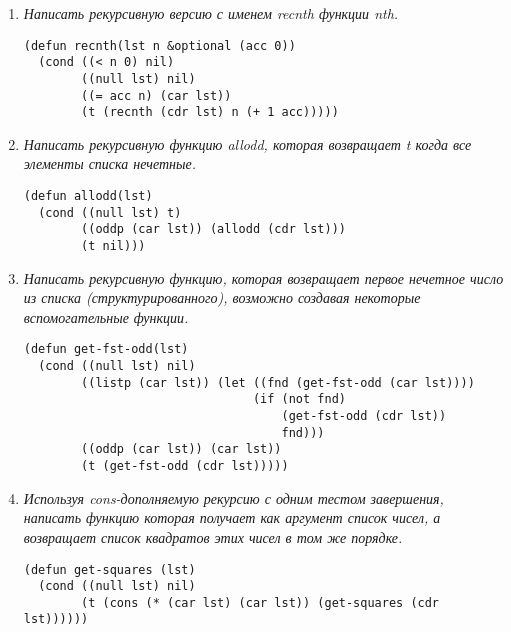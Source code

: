 \begin{enumerate}[wide=0pt]
\begin{lstlisting}
;; ================================ (b) =================================
(defun rec-add-structured (lst &optional (acc 0))
  (cond ((null lst) acc)
        ((numberp (car lst)) (rec-add-structured (cdr lst) (+ acc (car lst))))
        ((listp (car lst))
                (rec-add-structured (cdr lst)
                                    (rec-add-structured (car lst) acc)))
        (t (rec-add-structured (cdr lst) acc))))
\end{lstlisting}
\item \textit{Написать рекурсивную версию с именем recnth функции nth.}
\begin{lstlisting}
(defun recnth(lst n &optional (acc 0))
  (cond ((< n 0) nil)
        ((null lst) nil)
        ((= acc n) (car lst))
        (t (recnth (cdr lst) n (+ 1 acc)))))
\end{lstlisting}
\item \textit{Написать рекурсивную функцию allodd, которая возвращает t когда все элементы списка нечетные.}
\begin{lstlisting}
(defun allodd(lst)
  (cond ((null lst) t)
        ((oddp (car lst)) (allodd (cdr lst)))
        (t nil)))
\end{lstlisting}
\item \textit{ Написать рекурсивную функцию, которая возвращает первое нечетное число из списка (структурированного), возможно создавая некоторые вспомогательные функции.}
\begin{lstlisting}
(defun get-fst-odd(lst)
  (cond ((null lst) nil)
        ((listp (car lst)) (let ((fnd (get-fst-odd (car lst))))
                                (if (not fnd)
                                    (get-fst-odd (cdr lst))
                                    fnd)))
        ((oddp (car lst)) (car lst))
        (t (get-fst-odd (cdr lst)))))
\end{lstlisting}
\item \textit{Используя cons-дополняемую рекурсию с одним тестом завершения, написать функцию которая получает как аргумент список чисел, а возвращает список квадратов этих чисел в том же порядке.}
\begin{lstlisting}
(defun get-squares (lst)
  (cond ((null lst) nil)
        (t (cons (* (car lst) (car lst)) (get-squares (cdr lst))))))
\end{lstlisting}
\end{enumerate}